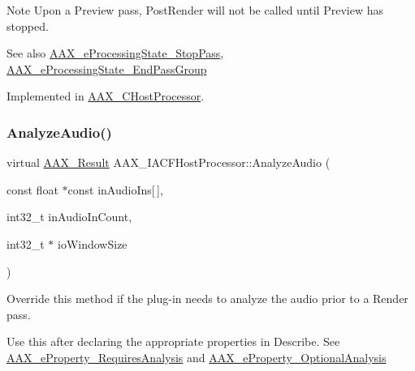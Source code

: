 \begin{DoxyNote}{Note}
Upon a Preview pass, Post\+Render will not be called until Preview has stopped.
\end{DoxyNote}
\begin{DoxySeeAlso}{See also}
\mbox{\hyperlink{a00491_a6ec854be40c8cf810dec97de3e56c0a7a07e96f54fb45a47b56e76091f0f44cbf}{A\+A\+X\+\_\+e\+Processing\+State\+\_\+\+Stop\+Pass}}, \mbox{\hyperlink{a00491_a6ec854be40c8cf810dec97de3e56c0a7a6c7dcf22600f9fe8a6113dbd5ffd1605}{A\+A\+X\+\_\+e\+Processing\+State\+\_\+\+End\+Pass\+Group}} 
\end{DoxySeeAlso}


Implemented in \mbox{\hyperlink{a01485_a3421c97eb8c3fb4c1287021d688b4871}{A\+A\+X\+\_\+\+C\+Host\+Processor}}.

\mbox{\label{a01693_a227c87038b0939728a78d7da7fdb05bb}} 
\subsubsection{\texorpdfstring{AnalyzeAudio()}{AnalyzeAudio()}}
{\footnotesize\ttfamily virtual \mbox{\hyperlink{a00392_a4d8f69a697df7f70c3a8e9b8ee130d2f}{A\+A\+X\+\_\+\+Result}} A\+A\+X\+\_\+\+I\+A\+C\+F\+Host\+Processor\+::\+Analyze\+Audio (\begin{DoxyParamCaption}\item[{const float $\ast$const}]{in\+Audio\+Ins\mbox{[}$\,$\mbox{]},  }\item[{int32\+\_\+t}]{in\+Audio\+In\+Count,  }\item[{int32\+\_\+t $\ast$}]{io\+Window\+Size }\end{DoxyParamCaption})\hspace{0.3cm}{\ttfamily [pure virtual]}}



Override this method if the plug-\/in needs to analyze the audio prior to a Render pass. 

Use this after declaring the appropriate properties in Describe. See \mbox{\hyperlink{a00662_a13e384f22825afd3db6d68395b79ce0da925c49bb79454b33bf1d5f4cb09d373f}{A\+A\+X\+\_\+e\+Property\+\_\+\+Requires\+Analysis}} and \mbox{\hyperlink{a00662_a13e384f22825afd3db6d68395b79ce0da5a2bacb421fc36f890a121f01a9e72ba}{A\+A\+X\+\_\+e\+Property\+\_\+\+Optional\+Analysis}}

